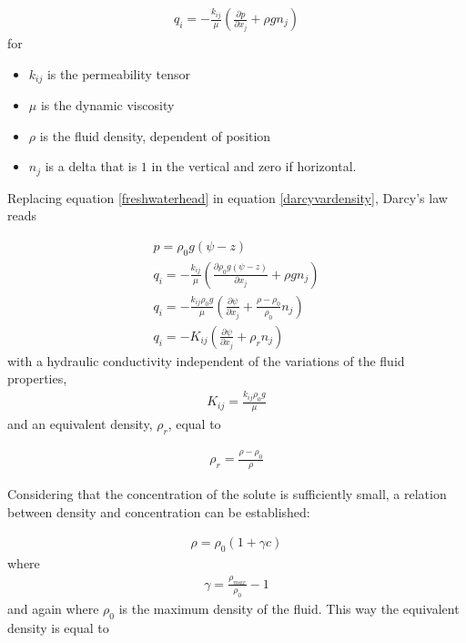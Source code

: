 \documentclass[11pt,twoside]{report}
\begin{document}
\begin{align}\label{darcyvardensity}
   q_{i} = -\frac{k_{ij}}{\mu}\left(\frac{\partial p}{\partial x_{j}} + \rho g n_{j} \right)
\end{align}
for
\begin{itemize}
   \item $k_{ij}$ is the permeability tensor
   \item $\mu$ is the dynamic viscosity
   \item $\rho$ is the fluid density, dependent of position
   \item $n_{j}$ is a delta that is $1$ in the vertical and zero if horizontal.
\end{itemize}

Replacing equation \eqref{freshwaterhead} in equation \eqref{darcyvardensity}, Darcy's law reads

\begin{align}
   p = \rho_{0}g\left( \psi - z \right)\\
   q_{i} = -\frac{k_{ij}}{\mu}\left(\frac{\partial\rho_{0}g\left( \psi - z \right) }{\partial x_{j}} + \rho g n_{j} \right) \\
   q_{i} = -\frac{k_{ij} \rho_{0}g}{\mu} \left(\frac{\partial \psi}{\partial x_{j}} + \frac{\rho - \rho_{0}}{\rho_{0}}n_{j} \right) \\
   q_{i} = -K_{ij}\left(\frac{\partial \psi}{\partial x_{j}} + \rho_{r}n_{j}\right)
\end{align}
with
a hydraulic conductivity independent of the variations of the fluid properties,
\begin{align}
   K_{ij} = \frac{k_{ij} \rho_{0}g}{\mu}
\end{align}
and an equivalent density, $\rho_{r}$, equal to 

\begin{align}
  \rho_{r} =  \frac{\rho - \rho_{0}}{\rho}
\end{align}

Considering that the concentration of the solute is sufficiently small, a relation between density and concentration can be established:

\begin{align}\label{rhogamma}
   \rho = \rho_{0}(1 + \gamma c)
\end{align}
where
\begin{align}
   \gamma = \frac{\rho_{max}}{\rho_{0}} - 1
\end{align}
and again where $\rho_{0}$ is the maximum density of the fluid. This way the equivalent density is equal to 
\end{document}
